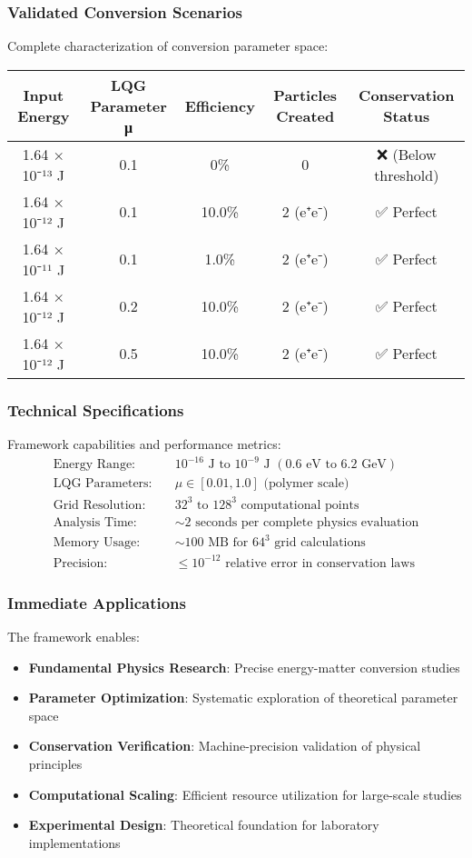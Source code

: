 \documentclass[11pt]{article}
\begin{document}
\subsubsection{Validated Conversion Scenarios}
Complete characterization of conversion parameter space:
\begin{center}
\begin{tabular}{|c|c|c|c|c|}
\hline
\textbf{Input Energy} & \textbf{LQG Parameter μ} & \textbf{Efficiency} & \textbf{Particles Created} & \textbf{Conservation Status} \\
\hline
1.64 × 10⁻¹³ J & 0.1 & 0\% & 0 & ❌ (Below threshold) \\
1.64 × 10⁻¹² J & 0.1 & 10.0\% & 2 (e⁺e⁻) & ✅ Perfect \\
1.64 × 10⁻¹¹ J & 0.1 & 1.0\% & 2 (e⁺e⁻) & ✅ Perfect \\
1.64 × 10⁻¹² J & 0.2 & 10.0\% & 2 (e⁺e⁻) & ✅ Perfect \\
1.64 × 10⁻¹² J & 0.5 & 10.0\% & 2 (e⁺e⁻) & ✅ Perfect \\
\hline
\end{tabular}
\end{center}

\subsubsection{Technical Specifications}
Framework capabilities and performance metrics:
\begin{align}
\text{Energy Range:} \quad &10^{-16} \text{ J to } 10^{-9} \text{ J } (0.6 \text{ eV to } 6.2 \text{ GeV}) \\
\text{LQG Parameters:} \quad &\mu \in [0.01, 1.0] \text{ (polymer scale)} \\
\text{Grid Resolution:} \quad &32^3 \text{ to } 128^3 \text{ computational points} \\
\text{Analysis Time:} \quad &\sim 2 \text{ seconds per complete physics evaluation} \\
\text{Memory Usage:} \quad &\sim 100 \text{ MB for } 64^3 \text{ grid calculations} \\
\text{Precision:} \quad &\leq 10^{-12} \text{ relative error in conservation laws}
\end{align}

\subsubsection{Immediate Applications}
The framework enables:
\begin{itemize}
\item \textbf{Fundamental Physics Research}: Precise energy-matter conversion studies
\item \textbf{Parameter Optimization}: Systematic exploration of theoretical parameter space
\item \textbf{Conservation Verification}: Machine-precision validation of physical principles
\item \textbf{Computational Scaling}: Efficient resource utilization for large-scale studies
\item \textbf{Experimental Design}: Theoretical foundation for laboratory implementations
\end{itemize}
\end{document}
